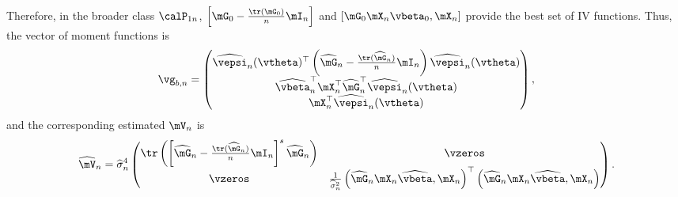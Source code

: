 Therefore, in the broader class $\calP_{1n}$, $\left[\mG_0 - \frac{\tr\left(\mG_0\right)}{n}\mI_n\right]$ and $\left[\mG_0\mX_n\vbeta_0, \mX_n\right]$ provide the best set of IV functions. Thus, the vector of moment functions is
\begin{equation*}
\vg_{b, n} = \begin{pmatrix}
               \widehat{\vepsi}_n(\vtheta)^\top\left(\widehat{\mG}_n - \frac{\tr(\widehat{\mG}_n)}{n}\mI_n \right)\widehat{\vepsi}_n(\vtheta) \\
               \widehat{\vbeta}_n^\top\mX_n ^\top\widehat{\mG}_n^\top\widehat{\vepsi}_n(\vtheta)\\
               \mX_n^\top\widehat{\vepsi}_n(\vtheta)
              \end{pmatrix}, 
\end{equation*}
%
and the corresponding estimated $\mV_n$ is
\begin{equation}
\widehat{\mV}_n = \widehat{\sigma}^4_n
\begin{pmatrix}
\tr\left(\left[\widehat{\mG}_n - \frac{\tr(\widehat{\mG}_n)}{n}\mI_n \right]^s\widehat{\mG}_n\right) & \vzeros \\
\vzeros & \frac{1}{\widehat{\sigma}_n^2}\left(\widehat{\mG}_n\mX_n\widehat{\vbeta}, \mX_n\right)^\top \left(\widehat{\mG}_n\mX_n\widehat{\vbeta}, \mX_n\right)
\end{pmatrix}.
\end{equation}



